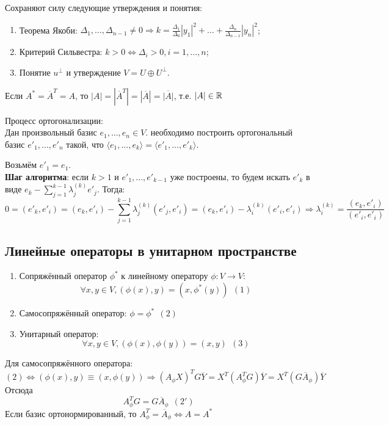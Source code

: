 Сохраняют силу следующие утверждения и понятия:
\begin{enumerate}
    \item Теорема Якоби: $\Delta_1,...,\Delta_{n-1} \neq 0 \Longrightarrow k = \frac{\Delta_1}{\Delta_0}|y_1|^2 + ... + \frac{\Delta_n}{\Delta_{n-1}}|y_n|^2$;
    \item Критерий Сильвестра: $k > 0 \Longleftrightarrow \Delta_i > 0, i = 1,...,n$;
    \item Понятие $u^\perp$ и утверждение $V = U \oplus U^\perp$.
\end{enumerate}
\begin{remark}
    Если $A^* = \overline{A}^T = A$, то $|A| = |\overline{A}^T| = |\overline{A}| = \overline{|A|}$, т.е. $|A| \in \mathbb{R}$
\end{remark}
\begin{algorithm} Процесс ортогонализации:\\
    Дан произвольный базис $e_1,...,e_n \in V$. необходимо построить ортогональный базис $e'_1,...,e'_n$ такой, что $\langle e_1,...,e_k \rangle = \langle e'_1,...,e'_k \rangle$.
\end{algorithm}
Возьмём $e'_1 = e_1$.\\
\textbf{Шаг алгоритма}: если $k > 1$ и $e'_1,...,e'_{k-1}$ уже построены, то будем искать $e'_k$ в виде $e_k - \sum \limits_{j=1}^{k-1} \lambda_j^{(k)}e'_j$. Тогда:
$$0 = (e'_k, e'_i) = (e_k, e'_i) - \sum \limits_{j=1}^{k-1} \lambda_j^{(k)}(e'_j, e'_i) = (e_k, e'_i) - \lambda_i^{(k)}(e'_i, e'_i) \Longrightarrow \lambda_i^{(k)} = \frac{(e_k, e'_i)}{(e'_i, e'_i)}$$ 
\subsection{Линейные операторы в унитарном пространстве}
\begin{enumerate}
    \item Сопряжённый оператор $\phi^*$ к линейному оператору $\phi: V \rightarrow V$:
    $$\forall x,y \in V, (\phi(x), y) = (x, \phi^*(y)) \ \ (1)$$
    \item Самосопряжённый оператор: $\phi = \phi^* \ \ (2)$
    \item Унитарный оператор:
    $$\forall x,y \in V, (\phi(x), \phi(y)) = (x, y) \ \ (3)$$
\end{enumerate}

Для самосопряжённого оператора:
$$(2) \Longleftrightarrow (\phi(x), y) \equiv (x, \phi(y)) \Longrightarrow (A_\phi X)^TG\overline{Y} = X^T(A_\phi^TG)\overline{Y} = X^T(G\overline{A}_\phi)\overline{Y}$$
Отсюда
$$A_\phi^TG = G\overline{A}_\phi \ \ (2')$$
Если базис ортонормированный, то $A_\phi^T = \overline{A}_\phi \Longleftrightarrow A = A^*$


